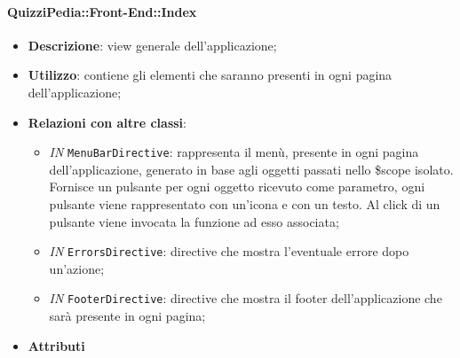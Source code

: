 	\paragraph{QuizziPedia::Front-End::Index}
	\begin{itemize}
		\item \textbf{Descrizione}: view generale dell'applicazione;
		\item \textbf{Utilizzo}: contiene gli elementi che saranno presenti in ogni pagina dell'applicazione;
		\item \textbf{Relazioni con altre classi}:
		\begin{itemize}
			\item \textit{IN} \texttt{MenuBarDirective}: rappresenta il menù, presente in ogni pagina dell'applicazione, generato in base agli oggetti passati nello \$scope isolato. Fornisce un pulsante per ogni oggetto ricevuto come parametro, ogni pulsante viene rappresentato con un’icona e con un testo. Al click di un pulsante viene invocata la funzione ad esso associata;
			\item \textit{IN} \texttt{ErrorsDirective}: directive che mostra l'eventuale errore dopo un'azione;
			\item \textit{IN} \texttt{FooterDirective}: directive che mostra il footer dell'applicazione che sarà presente in ogni pagina;
		\end{itemize}
		\item \textbf{Attributi}
	\end{itemize}